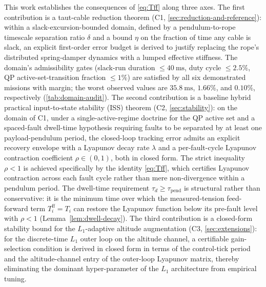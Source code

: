 This work establishes the consequences of \eqref{eq:Tff} along three axes. The first contribution is a taut-cable reduction theorem (C1, \cref{sec:reduction-and-reference}): within a slack-excursion-bounded domain, defined by a pendulum-to-rope timescale separation ratio $\delta$ and a bound $\eta$ on the fraction of time any cable is slack, an explicit first-order error budget is derived to justify replacing the rope's distributed spring-damper dynamics with a lumped effective stiffness. The domain's admissibility gates (slack-run duration $\le \SI{40}{\milli\second}$, duty cycle $\le 2.5\%$, QP active-set-transition fraction $\le 1\%$) are satisfied by all six demonstrated missions with margin; the worst observed values are $\SI{35.8}{\milli\second}$, $1.66\%$, and $0.10\%$, respectively (\cref{tab:domain-audit}). The second contribution is a baseline hybrid practical input-to-state stability (ISS) theorem (C2, \cref{sec:stability}): on the domain of C1, under a single-active-regime doctrine for the QP active set and a spaced-fault dwell-time hypothesis requiring faults to be separated by at least one payload-pendulum period, the closed-loop tracking error admits an explicit recovery envelope with a Lyapunov decay rate $\lambda$ and a per-fault-cycle Lyapunov contraction coefficient $\rho \in (0,1)$, both in closed form. The strict inequality $\rho < 1$ is achieved specifically by the identity \eqref{eq:Tff}, which certifies Lyapunov contraction across each fault cycle rather than mere non-divergence within a pendulum period. The dwell-time requirement $\tau_d \ge \tau_{\mathrm{pend}}$ is structural rather than conservative: it is the minimum time over which the measured-tension feed-forward term $T_i^{\mathrm{ff}} = T_i$ can restore the Lyapunov function below its pre-fault level with $\rho < 1$ (Lemma~\ref{lem:dwell-decay}). The third contribution is a closed-form stability bound for the $L_1$-adaptive altitude augmentation (C3, \cref{sec:extensions}): for the discrete-time $L_1$ outer loop on the altitude channel, a certifiable gain-selection condition is derived in closed form in terms of the control-tick period and the altitude-channel entry of the outer-loop Lyapunov matrix, thereby eliminating the dominant hyper-parameter of the $L_1$ architecture from empirical tuning.

